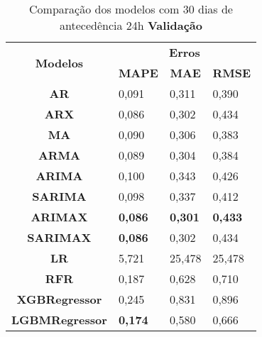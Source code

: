 \begin{table}[H]
	\centering
	\caption{Comparação dos modelos com 30 dias de antecedência 24h \textbf{Validação} }\label{tb:60-24vld}
	\begin{tabular}{@{}clll@{}}
		\toprule
		\multirow{2}{*}{\textbf{Modelos}} & \multicolumn{3}{c}{\textbf{Erros}}                                                                       \\ \cmidrule(l){2-4} 
		& \multicolumn{1}{c}{\textbf{MAPE}} & \multicolumn{1}{c}{\textbf{MAE}} & \multicolumn{1}{c}{\textbf{RMSE}} \\ \hline
\textbf{AR}                       & 0,091                             & 0,311                            & 0,390                             \\
\textbf{ARX}                      & 0,086                             & 0,302                            & 0,434                             \\
\textbf{MA}                       & 0,090                             & 0,306                            & 0,383                             \\
\textbf{ARMA}                     & 0,089                             & 0,304                            & 0,384                             \\
\textbf{ARIMA}                    & 0,100                             & 0,343                            & 0,426                             \\
\textbf{SARIMA}                   & 0,098                             & 0,337                            & 0,412                             \\
\textbf{ARIMAX}                   & \textbf{0,086}                             & \textbf{0,301}                            & \textbf{0,433}                             \\
\textbf{SARIMAX}                  & \textbf{0,086}                             & 0,302                            & 0,434                             \\
\textbf{LR}                       & 5,721                             & 25,478                           & 25,478                            \\
\textbf{RFR}                      & 0,187                             & 0,628                            & 0,710                             \\
\textbf{XGBRegressor}             & 0,245                             & 0,831                            & 0,896                             \\
\textbf{LGBMRegressor}            & \textbf{0,174}                             & 0,580                            & 0,666                             \\ \bottomrule
	\end{tabular}

\end{table}

